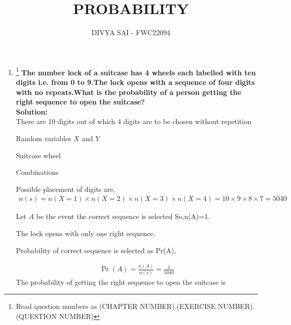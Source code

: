 \documentclass{article}
\providecommand{\pr}[1]{\ensuremath{\Pr\left(#1\right)}}
\newcommand{\solution}{\noindent \textbf{Solution: }}
\begin{document}
\title{PROBABILITY}
\author{\Large DIVYA SAI - FWC22094}
\date{}

\maketitle
\begin{enumerate}[label=16.\arabic{enumi}.\arabic{enumii}]%
\setcounter{enumi}{3}
\setcounter{enumii}{10}

\item \footnote{Read question numbers as (CHAPTER NUMBER).(EXERCISE NUMBER).(QUESTION NUMBER)}
\textbf {The number lock of a suitcase has 4 wheels each labelled with ten digits i.e. from 0 to 9.The lock opens with a sequence of four digits with no repeats.What is the probability of a person getting the right sequence to open the suitcase?}\\[1ex]

\solution\\
There are 10 digits out of which 4 digits are to be chosen without repetition
\begin{table}[h]
	
	 \label{table:1}\caption{Random variables $X$ and $Y$}
\end{table}

\begin{table}[h]
	
	 \label{table:2}\caption{Suitcase wheel}
\end{table}

\begin{table}[h]
	
 \label{table:3}\caption{Combinations}
\end{table}

Possible placement of digits are,
\begin{align}
n(s)=n(X=1) \times n(X=2) \times n(X=3) \times n(X=4)
=10 \times 9 \times 8 \times 7 = 5040 
\end{align}

Let $A$ be the event the correct sequence is selected So,n(A)=1.

The lock opens with only one right sequence.

Probability of correct sequence is selected as Pr(A),

\begin{align}
\pr{A}=\frac{n(A)}{n(s)}=\frac{1}{5040}
\end{align}
The probability of getting the right sequence to open the suitcase is 
\end{enumerate}
\end{document}
